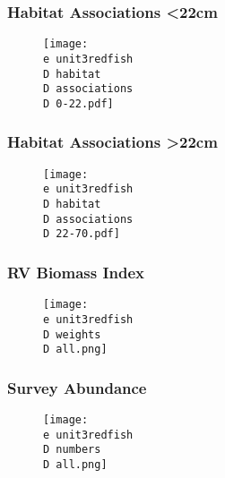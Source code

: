 \documentclass{beamer}
\begin{document}

\begin{frame}
\frametitle{Habitat Associations \textless 22cm}
\vspace*{-0.3cm}
\begin{figure}

 \centerline{\texttt{[image: \\e unit3redfish\\D habitat\\D associations\\D 0-22.pdf]}}

 \end{figure}
 \end{frame}


\begin{frame}
\frametitle{Habitat Associations \textgreater 22cm}
\vspace*{-0.3cm}
\begin{figure}

 \centerline{\texttt{[image: \\e unit3redfish\\D habitat\\D associations\\D 22-70.pdf]}}

 \end{figure}
 \end{frame}




\begin{frame}
\frametitle{RV Biomass Index}

\begin{figure}

 \centerline{\texttt{[image: \\e unit3redfish\\D weights\\D all.png]}}

 \end{figure}
 \end{frame}

\begin{frame}
\frametitle{Survey Abundance}
\begin{figure}

 \centerline{\texttt{[image: \\e unit3redfish\\D numbers\\D all.png]}}

 \end{figure}
 \end{frame}

\end{document}
